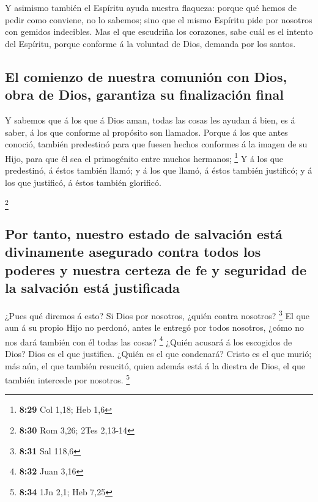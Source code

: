  Y asimismo también el Espíritu ayuda nuestra flaqueza:
porque qué hemos de pedir como conviene, no lo sabemos; sino que el
mismo Espíritu pide por nosotros con gemidos indecibles. 
Mas el que escudriña los corazones, sabe cuál es el intento del
Espíritu, porque conforme á la voluntad de Dios, demanda por los santos.

\hypertarget{el-comienzo-de-nuestra-comuniuxf3n-con-dios-obra-de-dios-garantiza-su-finalizaciuxf3n-final}{%
\subsection{El comienzo de nuestra comunión con Dios, obra de Dios,
garantiza su finalización
final}\label{el-comienzo-de-nuestra-comuniuxf3n-con-dios-obra-de-dios-garantiza-su-finalizaciuxf3n-final}}

 Y sabemos que á los que á Dios aman, todas las cosas les
ayudan á bien, es á saber, á los que conforme al propósito son llamados.
 Porque á los que antes conoció, también predestinó para
que fuesen hechos conformes á la imagen de su Hijo, para que él sea el
primogénito entre muchos hermanos; \footnote{\textbf{8:29} Col 1,18; Heb
  1,6}  Y á los que predestinó, á éstos también llamó; y
á los que llamó, á éstos también justificó; y á los que justificó, á
éstos también glorificó.

\footnote{\textbf{8:30} Rom 3,26; 2Tes 2,13-14}

\hypertarget{por-tanto-nuestro-estado-de-salvaciuxf3n-estuxe1-divinamente-asegurado-contra-todos-los-poderes-y-nuestra-certeza-de-fe-y-seguridad-de-la-salvaciuxf3n-estuxe1-justificada}{%
\subsection{Por tanto, nuestro estado de salvación está divinamente
asegurado contra todos los poderes y nuestra certeza de fe y seguridad
de la salvación está
justificada}\label{por-tanto-nuestro-estado-de-salvaciuxf3n-estuxe1-divinamente-asegurado-contra-todos-los-poderes-y-nuestra-certeza-de-fe-y-seguridad-de-la-salvaciuxf3n-estuxe1-justificada}}

 ¿Pues qué diremos á esto? Si Dios por nosotros, ¿quién
contra nosotros? \footnote{\textbf{8:31} Sal 118,6}  El
que aun á su propio Hijo no perdonó, antes le entregó por todos
nosotros, ¿cómo no nos dará también con él todas las cosas? \footnote{\textbf{8:32}
  Juan 3,16}  ¿Quién acusará á los escogidos de Dios?
Dios es el que justifica.  ¿Quién es el que condenará?
Cristo es el que murió; más aún, el que también resucitó, quien además
está á la diestra de Dios, el que también intercede por nosotros.
\footnote{\textbf{8:34} 1Jn 2,1; Heb 7,25}

